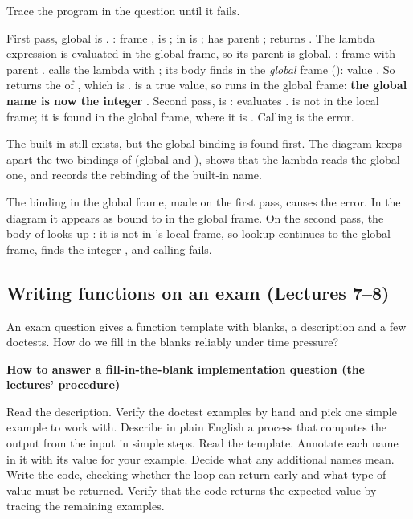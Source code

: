 \documentclass[10pt]{scrartcl}
\newenvironment{howto}[1]{\begin{mdframed}[style=howtostyle]{\color{NavyBlue}\textbf{#1}}\par\vspace{2pt}}{\end{mdframed}}
\begin{document}
\begin{example*}
Trace the program in the question until it fails.
\begin{steps}
  \ii First pass, global  is . : frame ,  is ;  in  is ;  has parent ; returns .
  \ii The lambda expression is evaluated in the global frame, so its parent is global.
  \ii {}: frame  with parent .  calls the lambda with ; its body  finds  in the \emph{global} frame (): value . So  returns the  of , which is .
  \ii {} is a true value, so  runs in the global frame: \textbf{the global name  is now the integer }.
  \ii Second pass,  is :  evaluates .  is not in the local frame; it is found in the global frame, where it is . Calling  is the error.
\end{steps}
The built-in  still exists, but the global binding is found first. The diagram keeps apart the two bindings of  (global and ), shows that the lambda reads the global one, and records the rebinding of the built-in name.
\end{example*}
\revisit The binding  in the global frame, made on the first pass, causes the error. In the diagram it appears as  bound to  in the global frame. On the second pass, the body of  looks up : it is not in 's local frame, so lookup continues to the global frame, finds the integer , and calling  fails.

\subsection{Writing functions on an exam (Lectures 7--8)}
\begin{qbox}
  An exam question gives a function template with blanks, a description and a few doctests. How do we fill in the blanks reliably under time pressure?
\end{qbox}
\begin{howto}{How to answer a fill-in-the-blank implementation question (the lectures' procedure)}
\begin{steps}
  \ii Read the description. Verify the doctest examples by hand and pick one simple example to work with.
  \ii Describe in plain English a process that computes the output from the input in simple steps.
  \ii Read the template. Annotate each name in it with its value for your example. Decide what any additional names mean.
  \ii Write the code, checking whether the loop can return early and what type of value must be returned.
  \ii Verify that the code returns the expected value by tracing the remaining examples.
\end{steps}
\end{howto}
\end{document}
